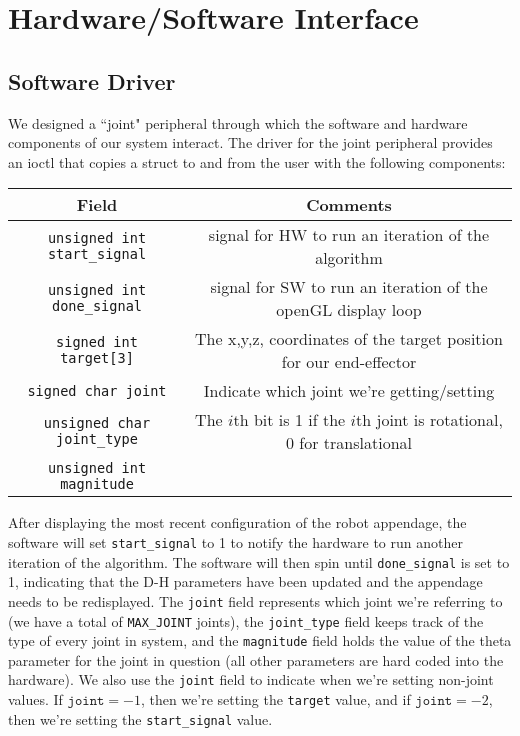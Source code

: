 \section{Hardware/Software Interface}

\subsection{Software Driver}

We designed a ``joint" peripheral through which the software and 
hardware components of our system interact. 
The driver for the joint peripheral provides an ioctl that copies a struct to and from the 
user with the following components:

\begin{center}
	\begin{tabular}{|c|c|}
		\hline
		Field & Comments \\
		\hline
		\texttt{unsigned int start\_signal} & signal for HW to run an iteration of the algorithm\\
		\hline
		\texttt{unsigned int done\_signal} & signal for SW to run an iteration of the openGL display loop\\
		\hline
		\texttt{signed int target[3]} &  The x,y,z, coordinates of the target position 
																						for our end-effector \\
		\hline
		\texttt{signed char joint} &  Indicate which joint we're getting/setting\\
		\hline
		\texttt{unsigned char joint\_type} & The $i$th bit is 1 if the $i$th joint is rotational, 
																					0 for translational \\
		\hline
		\texttt{unsigned int magnitude} & ~\\
		\hline
	\end{tabular}
\end{center}
After displaying the most recent configuration of the robot appendage, the software will set
\texttt{start\_signal} to 1 to notify the hardware to run another iteration of the algorithm. The
software will then spin until \texttt{done\_signal} is set to 1, indicating that the D-H parameters have been
updated and the appendage needs to be redisplayed.
The \texttt{joint} field represents which joint we're referring to 
(we have a total of \texttt{MAX\_JOINT} joints), the \texttt{joint\_type}
field keeps track of the type of every joint in system,  
and the \texttt{magnitude} field holds the value of the theta parameter for the joint in question (all other parameters are hard coded
		into the hardware).
We also use the \texttt{joint} field to indicate when we're setting non-joint values. If
$\texttt{joint} = -1$, then we're setting the \texttt{target} value, and if $\texttt{joint} = -2$,
then we're setting the \texttt{start\_signal} value.

